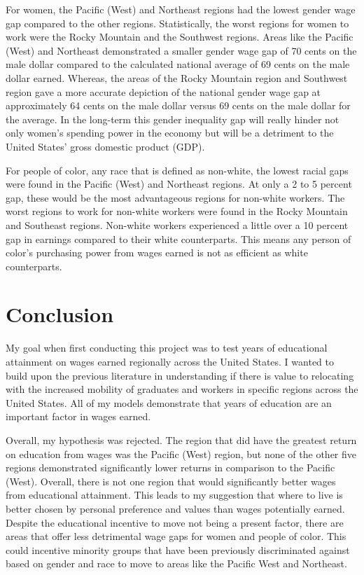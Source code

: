 \documentclass[12pt, English]{article}
\begin{document}
For women, the Pacific (West) and Northeast regions had the lowest gender wage gap compared to the other regions. Statistically, the worst regions for women to work were the Rocky Mountain and the Southwest regions. Areas like the Pacific (West) and Northeast demonstrated a smaller gender wage gap of 70 cents on the male dollar compared to the calculated national average of 69 cents on the male dollar earned. Whereas, the areas of the Rocky Mountain region and Southwest region gave a more accurate depiction of the national gender wage gap at approximately 64 cents on the male dollar versus 69 cents on the male dollar for the average. In the long-term this gender inequality gap will really hinder not only women's spending power in the economy but will be a detriment to the United States' gross domestic product (GDP).

For people of color, any race that is defined as non-white, the lowest racial gaps were found in the Pacific (West) and Northeast regions. At only a 2 to 5 percent gap, these would be the most advantageous regions for non-white workers. The worst regions to work for non-white workers were found in the Rocky Mountain and Southeast regions. Non-white workers experienced a little over a 10 percent gap in earnings compared to their white counterparts. This means any person of color's purchasing power from wages earned is not as efficient as white counterparts. 

\section{Conclusion}
My goal when first conducting this project was to test years of educational attainment on wages earned regionally across the United States. I wanted to build upon the previous literature in understanding if there is value to relocating with the increased mobility of graduates and workers in specific regions across the United States. All of my models demonstrate that years of education are an important factor in wages earned.

Overall, my hypothesis was rejected. The region that did have the greatest return on education from wages was the Pacific (West) region, but none of the other five regions demonstrated significantly lower returns in comparison to the Pacific (West). Overall, there is not one region that would significantly better wages from educational attainment. This leads to my suggestion that where to live is better chosen by personal preference and values than wages potentially earned. Despite the educational incentive to move not being a present factor, there are areas that offer less detrimental wage gaps for women and people of color. This could incentive minority groups that have been previously discriminated against based on gender and race to move to areas like the Pacific West and Northeast. 
\end{document}
